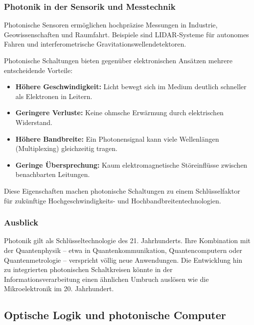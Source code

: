 \subsubsection{Photonik in der Sensorik und Messtechnik}

Photonische Sensoren ermöglichen hochpräzise Messungen in Industrie, Geowissenschaften und Raumfahrt.  
Beispiele sind LIDAR-Systeme für autonomes Fahren und interferometrische Gravitationswellendetektoren.

\vspace{1em}
\begin{tcolorbox}[physikbox, title=Photonische Schaltungen vs. Elektronische Schaltungen \label{box:photon_vs_electron}]
	\small
	Photonische Schaltungen bieten gegenüber elektronischen Ansätzen mehrere entscheidende Vorteile:
	\begin{itemize}
		\item \textbf{Höhere Geschwindigkeit:} Licht bewegt sich im Medium deutlich schneller als Elektronen in Leitern.
		\item \textbf{Geringere Verluste:} Keine ohmsche Erwärmung durch elektrischen Widerstand.
		\item \textbf{Höhere Bandbreite:} Ein Photonensignal kann viele Wellenlängen (Multiplexing) gleichzeitig tragen.
		\item \textbf{Geringe Übersprechung:} Kaum elektromagnetische Störeinflüsse zwischen benachbarten Leitungen.
	\end{itemize}
	Diese Eigenschaften machen photonische Schaltungen zu einem Schlüsselfaktor für zukünftige Hochgeschwindigkeits- und Hochbandbreitentechnologien.
\end{tcolorbox}

\subsubsection{Ausblick}

Photonik gilt als Schlüsseltechnologie des 21. Jahrhunderts. Ihre Kombination mit der Quantenphysik – etwa in Quantenkommunikation, Quantencomputern oder Quantenmetrologie – verspricht völlig neue Anwendungen.  
Die Entwicklung hin zu integrierten photonischen Schaltkreisen könnte in der Informationsverarbeitung einen ähnlichen Umbruch auslösen wie die Mikroelektronik im 20. Jahrhundert.

\subsection{Optische Logik und photonische Computer}

